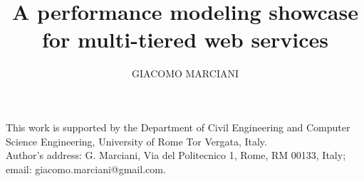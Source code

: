 \documentclass[prodmode,gmcs]{acmlarge}
\title{A performance modeling showcase for multi-tiered web services}
\author{GIACOMO MARCIANI \affil{University of Rome Tor Vergata}}
\numberwithin{equation}{section}
\begin{document}
	
\begin{bottomstuff}
This work is supported by the Department of Civil Engineering and Computer Science
Engineering, University of Rome Tor Vergata, Italy.\\
Author's address: G. Marciani, Via del Politecnico 1, Rome, RM 00133, Italy;
email: giacomo.marciani@gmail.com.
\end{bottomstuff}

\maketitle


















\elecappendix




\end{document}
